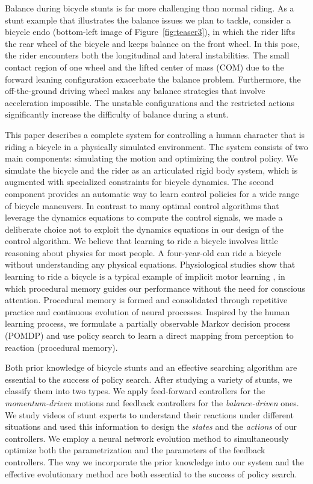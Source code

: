 Balance during bicycle stunts is far more challenging than normal riding. As a stunt example that illustrates the balance issues we plan to tackle, consider a bicycle endo (bottom-left image of Figure~\ref{fig:teaser3}), in which the rider lifts the rear wheel of the bicycle and keeps balance on the front wheel. In this pose, the rider encounters both the longitudinal and lateral instabilities. The small contact region of one wheel and the lifted center of mass (COM) due to the forward leaning configuration exacerbate the balance problem. Furthermore, the off-the-ground driving wheel makes any balance strategies that involve acceleration impossible. The unstable configurations and the restricted actions significantly increase the difficulty of balance during a stunt.

This paper describes a complete system for controlling a human character that is riding a bicycle in a physically simulated environment. The system consists of two main components: simulating the motion and optimizing the control policy. We simulate the bicycle and the rider as an articulated rigid body system, which is augmented with specialized constraints for bicycle dynamics. The second component provides an automatic way to learn control policies for a wide range of bicycle maneuvers. In contrast to many optimal control algorithms that leverage the dynamics equations to compute the control signals, we made a deliberate choice not to exploit the dynamics equations in our design of the control algorithm. We believe that learning to ride a bicycle involves little reasoning about physics for most people. A four-year-old can ride a bicycle without understanding any physical equations. Physiological studies show that learning to ride a bicycle is a typical example of implicit motor learning \cite{Chambaron2009}, in which procedural memory guides our performance without the need for conscious attention. Procedural memory is formed and consolidated through repetitive practice and continuous evolution of neural processes. Inspired by the human learning process, we formulate a partially observable Markov decision process (POMDP) and use policy search to learn a direct mapping from perception to reaction (procedural memory).

Both prior knowledge of bicycle stunts and an effective searching algorithm are essential to the success of policy search. After studying a variety of stunts, we classify them into two types. We apply feed-forward controllers for the \emph{momentum-driven} motions and feedback controllers for the \emph{balance-driven} ones. We study videos of stunt experts to understand their reactions under different situations and used this information to design the \emph{states} and the \emph{actions} of our controllers. We employ a neural network evolution method to simultaneously optimize both the parametrization and the parameters of the feedback controllers. The way we incorporate the prior knowledge into our system and the effective evolutionary method are both essential to the success of policy search.

